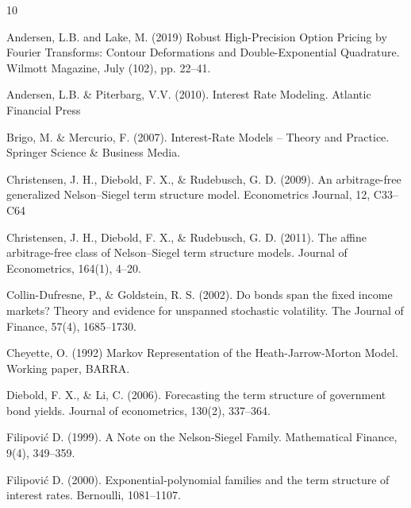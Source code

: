 \documentclass[pdftex,11pt,a4paper] {article}
\begin{document}
\begin{thebibliography}{10} %

 Andersen, L.B. and Lake, M. (2019) Robust High-Precision Option Pricing by Fourier Transforms: Contour Deformations and Double-Exponential Quadrature. Wilmott Magazine, July (102), pp. 22--41.

Andersen, L.B. \& Piterbarg, V.V. (2010). Interest Rate Modeling. Atlantic Financial Press

Brigo, M. \& Mercurio, F. (2007). Interest-Rate Models -- Theory and Practice. Springer Science \& Business Media. 

Christensen, J. H., Diebold, F. X., \& Rudebusch, G. D. (2009). An arbitrage-free generalized Nelson–Siegel term structure model. Econometrics Journal, 12, C33--C64

Christensen, J. H., Diebold, F. X., \& Rudebusch, G. D. (2011). The affine arbitrage-free class of Nelson–Siegel term structure models. Journal of Econometrics, 164(1), 4--20.

Collin-Dufresne, P., \& Goldstein, R. S. (2002). Do bonds span the fixed income markets? Theory and evidence for unspanned stochastic volatility. The Journal of Finance, 57(4), 1685--1730.

Cheyette, O. (1992) Markov Representation of the Heath-Jarrow-Morton Model.
Working paper, BARRA.

Diebold, F. X., \& Li, C. (2006). Forecasting the term structure of government bond yields. Journal of econometrics, 130(2), 337--364.

Filipovi\'{c} D. (1999). A Note on the Nelson-Siegel Family. Mathematical Finance,
9(4), 349--359. 

Filipovi\'{c} D. (2000). Exponential-polynomial families and the term structure of interest rates. Bernoulli, 1081--1107.


\end{thebibliography}
\end{document}
